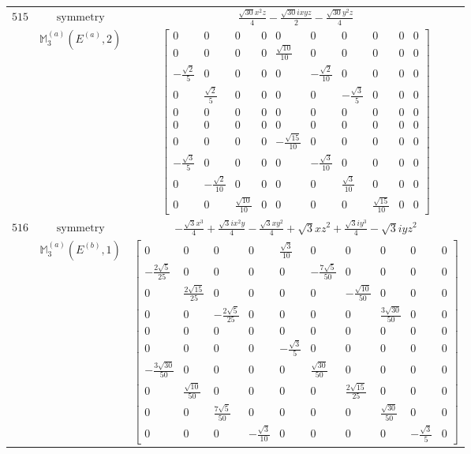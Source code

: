 \documentclass[fleqn,8pt,landscape]{jsarticle}
\begin{document}
\begin{longtable}{ccc}
$ 515 $ & $ \text{symmetry} $ & $ \frac{\sqrt{30} x^{2} z}{4} - \frac{\sqrt{30} i x y z}{2} - \frac{\sqrt{30} y^{2} z}{4} $ \\
$  $ & $ \mathbb{M}_{3}^{(a)}(E^{(a)},2) $ & $ \begin{bmatrix} 0 & 0 & 0 & 0 & 0 & 0 & 0 & 0 & 0 & 0 \\ 0 & 0 & 0 & 0 & \frac{\sqrt{10}}{10} & 0 & 0 & 0 & 0 & 0 \\ - \frac{\sqrt{2}}{5} & 0 & 0 & 0 & 0 & - \frac{\sqrt{2}}{10} & 0 & 0 & 0 & 0 \\ 0 & \frac{\sqrt{2}}{5} & 0 & 0 & 0 & 0 & - \frac{\sqrt{3}}{5} & 0 & 0 & 0 \\ 0 & 0 & 0 & 0 & 0 & 0 & 0 & 0 & 0 & 0 \\ 0 & 0 & 0 & 0 & 0 & 0 & 0 & 0 & 0 & 0 \\ 0 & 0 & 0 & 0 & - \frac{\sqrt{15}}{10} & 0 & 0 & 0 & 0 & 0 \\ - \frac{\sqrt{3}}{5} & 0 & 0 & 0 & 0 & - \frac{\sqrt{3}}{10} & 0 & 0 & 0 & 0 \\ 0 & - \frac{\sqrt{2}}{10} & 0 & 0 & 0 & 0 & \frac{\sqrt{3}}{10} & 0 & 0 & 0 \\ 0 & 0 & \frac{\sqrt{10}}{10} & 0 & 0 & 0 & 0 & \frac{\sqrt{15}}{10} & 0 & 0 \end{bmatrix} $ \\ \hline
$ 516 $ & $ \text{symmetry} $ & $ - \frac{\sqrt{3} x^{3}}{4} + \frac{\sqrt{3} i x^{2} y}{4} - \frac{\sqrt{3} x y^{2}}{4} + \sqrt{3} x z^{2} + \frac{\sqrt{3} i y^{3}}{4} - \sqrt{3} i y z^{2} $ \\
$  $ & $ \mathbb{M}_{3}^{(a)}(E^{(b)},1) $ & $ \begin{bmatrix} 0 & 0 & 0 & 0 & \frac{\sqrt{3}}{10} & 0 & 0 & 0 & 0 & 0 \\ - \frac{2 \sqrt{5}}{25} & 0 & 0 & 0 & 0 & - \frac{7 \sqrt{5}}{50} & 0 & 0 & 0 & 0 \\ 0 & \frac{2 \sqrt{15}}{25} & 0 & 0 & 0 & 0 & - \frac{\sqrt{10}}{50} & 0 & 0 & 0 \\ 0 & 0 & - \frac{2 \sqrt{5}}{25} & 0 & 0 & 0 & 0 & \frac{3 \sqrt{30}}{50} & 0 & 0 \\ 0 & 0 & 0 & 0 & 0 & 0 & 0 & 0 & 0 & 0 \\ 0 & 0 & 0 & 0 & - \frac{\sqrt{3}}{5} & 0 & 0 & 0 & 0 & 0 \\ - \frac{3 \sqrt{30}}{50} & 0 & 0 & 0 & 0 & \frac{\sqrt{30}}{50} & 0 & 0 & 0 & 0 \\ 0 & \frac{\sqrt{10}}{50} & 0 & 0 & 0 & 0 & \frac{2 \sqrt{15}}{25} & 0 & 0 & 0 \\ 0 & 0 & \frac{7 \sqrt{5}}{50} & 0 & 0 & 0 & 0 & \frac{\sqrt{30}}{50} & 0 & 0 \\ 0 & 0 & 0 & - \frac{\sqrt{3}}{10} & 0 & 0 & 0 & 0 & - \frac{\sqrt{3}}{5} & 0 \end{bmatrix} $ \\ \hline

\end{longtable}
\end{document}
